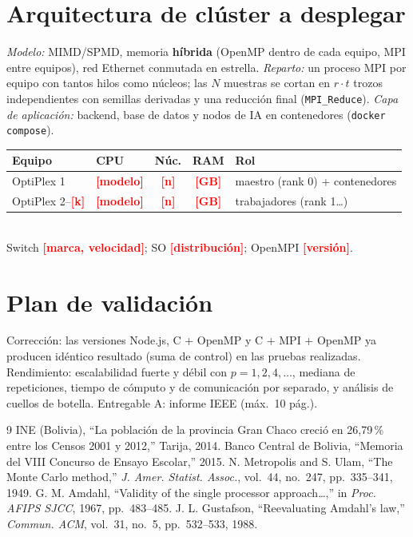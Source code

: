 \documentclass[conference]{IEEEtran}
\newcommand{\TODO}[1]{\textcolor{red}{\textbf{[#1]}}}
\begin{document}
\section{Arquitectura de cl\'uster a desplegar}
\emph{Modelo:} MIMD/SPMD, memoria \textbf{h\'ibrida} (OpenMP dentro de cada equipo, MPI entre equipos), red Ethernet conmutada en estrella. \emph{Reparto:} un proceso MPI por equipo con tantos hilos como n\'ucleos; las $N$ muestras se cortan en $r\cdot t$ trozos independientes con semillas derivadas y una reducci\'on final (\texttt{MPI\_Reduce}). \emph{Capa de aplicaci\'on:} backend, base de datos y nodos de IA en contenedores (\texttt{docker compose}).

\begin{center}\scriptsize
\begin{tabular}{@{}llccl@{}}
\toprule Equipo & CPU & N\'uc. & RAM & Rol\\\midrule
OptiPlex 1 & \TODO{modelo} & \TODO{n} & \TODO{GB} & maestro (rank 0) + contenedores\\
OptiPlex 2--\TODO{k} & \TODO{modelo} & \TODO{n} & \TODO{GB} & trabajadores (rank 1\ldots)\\\bottomrule
\end{tabular}\\[2pt]
Switch \TODO{marca, velocidad}; SO \TODO{distribuci\'on}; OpenMPI \TODO{versi\'on}.
\end{center}

\section{Plan de validaci\'on}
Correcci\'on: las versiones Node.js, C + OpenMP y C + MPI + OpenMP ya producen id\'entico resultado (suma de control) en las pruebas realizadas. Rendimiento: escalabilidad fuerte y d\'ebil con $p=1,2,4,\dots$, mediana de repeticiones, tiempo de c\'omputo y de comunicaci\'on por separado, y an\'alisis de cuellos de botella. Entregable A: informe IEEE (m\'ax.\ 10 p\'ag.).

\begin{thebibliography}{9}\scriptsize
{} INE (Bolivia), ``La poblaci\'on de la provincia Gran Chaco creci\'o en 26,79\,\% entre los Censos 2001 y 2012,'' Tarija, 2014.
 Banco Central de Bolivia, ``Memoria del VIII Concurso de Ensayo Escolar,'' 2015.
 N. Metropolis and S. Ulam, ``The Monte Carlo method,'' \emph{J. Amer. Statist. Assoc.}, vol.~44, no.~247, pp.~335--341, 1949.
 G. M. Amdahl, ``Validity of the single processor approach\ldots,'' in \emph{Proc. AFIPS SJCC}, 1967, pp.~483--485.
 J. L. Gustafson, ``Reevaluating Amdahl's law,'' \emph{Commun. ACM}, vol.~31, no.~5, pp.~532--533, 1988.
\end{thebibliography}
\end{document}
